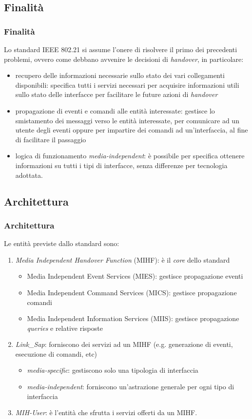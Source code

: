 \documentclass[10pt]{beamer}
\begin{document}
\subsection{Finalità}
\begin{frame}
\frametitle{Finalità}
Lo standard IEEE 802.21 si assume l'onere di risolvere il primo dei precedenti problemi, ovvero come debbano avvenire le decisioni di {\em handover}, in particolare:
\begin{itemize}
\item recupero delle informazioni necessarie sullo stato dei vari collegamenti disponibili: specifica tutti i servizi necessari per acquisire informazioni utili sullo stato delle interfacce per facilitare le future azioni di {\em handover}
\item propagazione di eventi e comandi alle entità interessate: gestisce lo smistamento dei messaggi verso le entità interessate, per comunicare ad un utente degli eventi oppure per impartire dei comandi ad un'interfaccia, al fine di facilitare il passaggio
\item logica di funzionamento {\em media-independent}: è possibile per specifica ottenere informazioni su tutti i tipi di interfacce, senza differenze per tecnologia adottata.
\end{itemize}
\end{frame}

\subsection{Architettura}
\begin{frame}
\frametitle{Architettura}
Le entità previste dallo standard sono:
\begin{enumerate}
\item {\em Media Independent Handover Function} (MIHF): è il {\em core} dello standard
\begin{itemize}
\item Media Independent Event Services (MIES): gestisce propagazione eventi
\item Media Independent Command Services (MICS): gestisce propagazione comandi
\item Media Independent Information Services (MIIS): gestisce propagazione {\em queries} e relative risposte
\end{itemize}

\item {\em Link\_Sap}: forniscono dei servizi ad un MIHF (e.g. generazione di eventi, esecuzione di comandi, etc)
\begin{itemize}
\item {\em media-specific}: gestiscono solo una tipologia di interfaccia
\item {\em media-independent}: forniscono un'astrazione generale per ogni tipo di interfaccia
\end{itemize}

\item {\em MIH-User}: è l'entità che sfrutta i servizi offerti da un MIHF.

\end{enumerate}
\end{frame}
\end{document}
